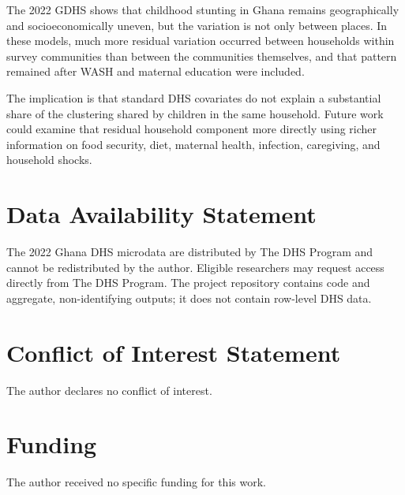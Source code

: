 \documentclass[11pt]{article}
\begin{document}
The 2022 GDHS shows that childhood stunting in Ghana remains geographically and socioeconomically uneven, but the variation is not only between places. In these models, much more residual variation occurred between households within survey communities than between the communities themselves, and that pattern remained after WASH and maternal education were included.

The implication is that standard DHS covariates do not explain a substantial share of the clustering shared by children in the same household. Future work could examine that residual household component more directly using richer information on food security, diet, maternal health, infection, caregiving, and household shocks.


\section*{Data Availability Statement}
The 2022 Ghana DHS microdata are distributed by The DHS Program and cannot be redistributed by the author. Eligible researchers may request access directly from The DHS Program. The project repository contains code and aggregate, non-identifying outputs; it does not contain row-level DHS data.

\section*{Conflict of Interest Statement}
The author declares no conflict of interest.

\section*{Funding}
The author received no specific funding for this work.



\end{document}
